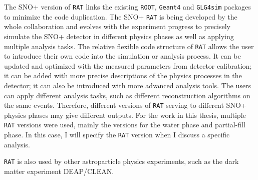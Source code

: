 The SNO+ version of \texttt{RAT} links the existing \texttt{ROOT}, \texttt{Geant4} and \texttt{GLG4sim} packages to minimize the code duplication. The SNO+ \texttt{RAT} is being developed by the whole collaboration and evolves with the experiment progress to precisely simulate the SNO+ detector in different physics phases as well as applying multiple analysis tasks. The relative flexible code structure of \texttt{RAT} allows the user to introduce their own code into the simulation or analysis process\cite{ratManual}. It can be updated and optimized with the measured parameters from detector calibration; it can be added with more precise descriptions of the physics processes in the detector; it can also be introduced with more advanced analysis tools. The users can apply different analysis tasks, such as different reconstruction algorithms on the same events\cite{ratManual}. Therefore, different versions of \texttt{RAT} serving to different SNO+ physics phases may give different outputs. For the work in this thesis, multiple \texttt{RAT} versions were used, mainly the versions for the water phase and partial-fill phase. In this case, I will specify the \texttt{RAT} version when I discuss a specific analysis.

\texttt{RAT} is also used by other astroparticle physics experiments, such as the dark matter experiment DEAP/CLEAN\cite{caldwell2014simulation}. 